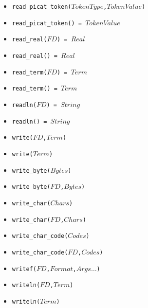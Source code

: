 \documentclass[10pt]{article}
\newcommand{\ignore}[1]{}
\begin{document}
\begin{multicols}{2}
\begin{scriptsize}
\begin{itemize}
   \item \texttt{read\_picat\_token($TokenType$,$TokenValue$)}
   \item \texttt{read\_picat\_token() = $TokenValue$}
   \item \texttt{read\_real($FD$) = $Real$}
   \item \texttt{read\_real() = $Real$}
   \item \texttt{read\_term($FD$) = $Term$}
   \item \texttt{read\_term() = $Term$}
   \item \texttt{readln($FD$) = $String$}
   \item \texttt{readln() = $String$}
   \item \texttt{write($FD$,$Term$)}
   \item \texttt{write($Term$)}
   \item \texttt{write\_byte($Bytes$)}
   \item \texttt{write\_byte($FD$,$Bytes$)}
   \item \texttt{write\_char($Chars$)}
   \item \texttt{write\_char($FD$,$Chars$)}
   \item \texttt{write\_char\_code($Codes$)}
   \item \texttt{write\_char\_code($FD$,$Codes$)}
   \item \texttt{writef($FD$,$Format$,$Args\ldots$)}
   \item \texttt{writeln($FD$,$Term$)}
   \item \texttt{writeln($Term$)}
\ignore{
   \item \texttt{peek\_int($FD$) = $Int$}\index{\texttt{peek\_int/1}}
   \item \texttt{peek\_real($FD$) = $Real$}\index{\texttt{peek\_real/1}}
}
\end{itemize}
\end{scriptsize}
\end{multicols}
\end{document}
